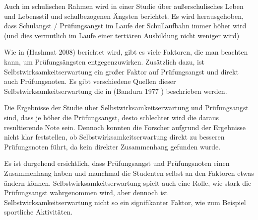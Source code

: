 \documentclass[11pt, a4paper]{article}
\begin{document}
	Auch im schulischen Rahmen wird in einer Studie über außerschulisches Leben und Lebensstil und schulbezogenen Ängsten berichtet. Es wird herausgehoben, dass Schulangst / Prüfungsangst im Laufe der Schullaufbahn immer höher wird (und dies vermutlich im Laufe einer tertiären Ausbildung nicht weniger wird) \cite{pixner2013prufungsangst}

	Wie in (Hashmat 2008) berichtet wird, gibt es viele Faktoren, die man beachten kann, um Prüfungsängsten entgegenzuwirken. Zusätzlich dazu, ist Selbstwirksamkeitserwartung ein großer Faktor auf Prüfungsangst und direkt auch Prüfungsnoten. Es gibt verschiedene Quellen dieser Selbstwirksamkeitserwartung die in (Bandura 1977 \cite{bandura1977self}) beschrieben werden.

	Die Ergebnisse der Studie über Selbstwirksamkeitserwartung und Prüfungsangst sind, dass je höher die Prüfungsangst, desto schlechter wird die daraus resultierende Note sein. Dennoch konnten die Forscher aufgrund der Ergebnisse nicht klar feststellen, ob Selbstwirksamkeitserwartung direkt zu besseren Prüfungsnoten führt, da kein direkter Zusammenhang gefunden wurde. \cite{barrows2013anxiety}

	Es ist durgehend ersichtlich, dass Prüfungsangst und Prüfungsnoten einen Zusammenhang haben und manchmal die Studenten selbst an den Faktoren etwas ändern können. Selbstwirksamkeitserwartung spielt auch eine Rolle, wie stark die Prüfungsangst wahrgenommen wird, aber dennoch ist Selbstwirksamkeitserwartung nicht so ein signifikanter Faktor, wie zum Beispiel sportliche Aktivitäten. \cite{barrows2013anxiety} \cite{hashmat2008factors}
\newpage

{}

\end{document}
